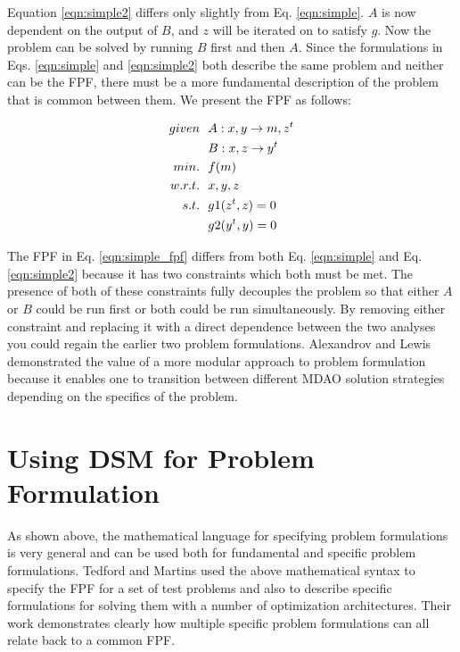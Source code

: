         Equation \ref{eqn:simple2} differs only slightly from Eq. \ref{eqn:simple}. $A$ is now dependent on the output of $B$, 
        and $z$ will be iterated on to satisfy $g$. Now the problem can be solved by running $B$ first and then $A$.
        Since the formulations in Eqs. \ref{eqn:simple} and \ref{eqn:simple2} both describe the same problem and neither can be the
        FPF, there must be a more fundamental description of the problem that is common between them. We present the FPF as follows: 

        \begin{align}
            given & \ \ A: {x,y} \rightarrow {m,z^t} \notag
            \\      & \ \ B: {x,z} \rightarrow {y^t} \notag
            \\min. &\ \ f(m) \notag
            \\w.r.t. & \ \ x,y,z \notag
            \\s.t. & \ \ g1(z^t,z) = 0 \notag
            \\     & \ \ g2(y^t,y) = 0
            \label{eqn:simple_fpf}
        \end{align}

        The FPF in Eq. \ref{eqn:simple_fpf} differs from both Eq. \ref{eqn:simple} and Eq. \ref{eqn:simple2} because it has 
        two constraints which both must be met. The presence of both of these constraints fully decouples the problem so that 
        either $A$ or $B$ could be run first or both could be run simultaneously. By removing either constraint and replacing 
        it with a direct dependence between the two analyses you could regain the earlier two problem formulations. Alexandrov
        and Lewis demonstrated the value of a more modular approach to problem formulation because it enables one to transition between different 
        MDAO solution strategies depending on the specifics of the problem\cite{Alex2000}.


    \section{Using DSM for Problem Formulation}

        As shown above, the mathematical language for specifying problem formulations is very general and can be used both for 
        fundamental and specific problem formulations. Tedford and Martins used the above mathematical syntax to specify the 
        FPF for a set of test problems and also to describe specific formulations for solving them with a 
        number of optimization architectures\cite{Tedford2009}. Their work demonstrates clearly how multiple specific 
        problem formulations can all relate back to a common FPF. 
        
